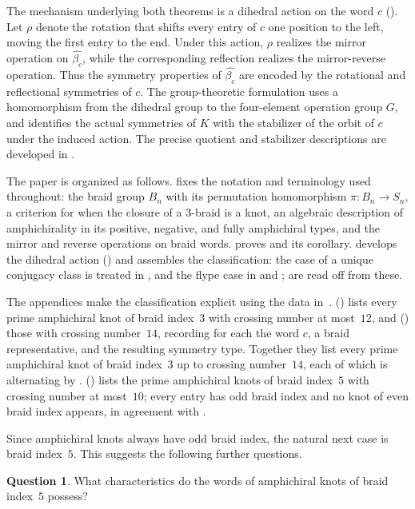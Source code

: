\documentclass[11pt]{article}
\theoremstyle{definition}
\newtheorem{question}{Question}
\begin{document}
\noindent The mechanism underlying both theorems is a dihedral action on the word $c$ (). Let $\rho$ denote the rotation that shifts every entry of $c$ one position to the left, moving the first entry to the end. Under this action, $\rho$ realizes the mirror operation on $\widehat{\beta_c}$, while the corresponding reflection realizes the mirror-reverse operation. Thus the symmetry properties of $\widehat{\beta_c}$ are encoded by the rotational and reflectional symmetries of $c$. The group-theoretic formulation uses a homomorphism from the dihedral group to the four-element operation group $G$, and identifies the actual symmetries of $K$ with the stabilizer of the orbit of $c$ under the induced action. The precise quotient and stabilizer descriptions are developed in .

The paper is organized as follows.  fixes the notation and
terminology used throughout: the braid group $B_n$ with its permutation
homomorphism $\pi\colon B_n\to S_n$, a criterion for when the closure of a
$3$-braid is a knot, an algebraic description of amphichirality in its positive,
negative, and fully amphichiral types, and the mirror and reverse operations on
braid words.  proves  and its corollary.  develops the dihedral action () and assembles the classification: the case of a unique conjugacy class is treated in , and the flype case in  and ;  are read off from these.

The appendices make the classification explicit
using the data in~\cite{knotinfo}.  () lists
every prime amphichiral knot of braid index~$3$ with crossing number at most~$12$, and
 () those with crossing number~$14$, recording
for each the word $c$, a braid representative, and the resulting symmetry
type. Together they list every prime amphichiral knot of braid index~$3$ up to crossing
number~$14$, each of which is alternating by
.  ()
lists the prime amphichiral knots of braid index~$5$ with crossing number at most~$10$;
every entry has odd braid index and no knot of even braid index appears, in
agreement with .

Since amphichiral knots always have odd braid index, the natural next case is
braid index~$5$. This suggests the following further questions.
\begin{question}
What characteristics do the words of amphichiral knots of braid
index~$5$ possess?
\end{question}
\end{document}
